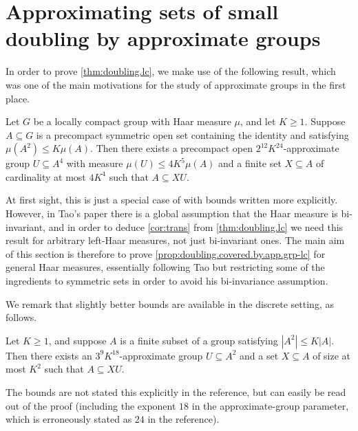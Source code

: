 \section{Approximating sets of small doubling by approximate groups}
In order to prove \cref{thm:doubling.lc}, we make use of the following result, which was one of the main motivations for the study of approximate groups in the first place.
\begin{prop}\label{prop:doubling.covered.by.app.grp-lc}
Let $G$ be a locally compact group with Haar measure $\mu$, and let $K\ge1$. Suppose $A\subseteq G$ is a precompact symmetric open set containing the identity and satisfying $\mu(A^2)\le K\mu(A)$. Then there exists a precompact open $2^{12}K^{24}$-approximate group $U\subseteq A^4$ with measure $\mu(U)\le 4K^5\mu(A)$ and a finite set $X\subseteq A$ of cardinality at most $4K^4$ such that $A\subseteq XU$.
\end{prop}
At first sight, this is just a special case of \cite[Theorem 4.6]{tao.product.set} with bounds written more explicitly. However, in Tao's paper there is a global assumption that the Haar measure is bi-invariant, and in order to deduce \cref{cor:trans} from \cref{thm:doubling.lc} we need this result for arbitrary left-Haar measures, not just bi-invariant ones. The main aim of this section is therefore to prove \cref{prop:doubling.covered.by.app.grp-lc} for general Haar measures, essentially following Tao but restricting some of the ingredients to symmetric sets in order to avoid his bi-invariance assumption.

We remark that slightly better bounds are available in the discrete setting, as follows.
\begin{prop}\label{prop:doubling.covered.by.app.grp}
Let $K\ge1$, and suppose $A$ is a finite subset of a group satisfying $|A^2|\le K|A|$. Then there exists an $3^9K^{18}$-approximate group $U\subseteq A^2$ and a set $X\subseteq A$ of size at most $K^2$ such that $A\subseteq XU$.
\end{prop}
The bounds are not stated this explicitly in the reference, but can easily be read out of the proof (including the exponent $18$ in the approximate-group parameter, which is erroneously stated as $24$ in the reference).


